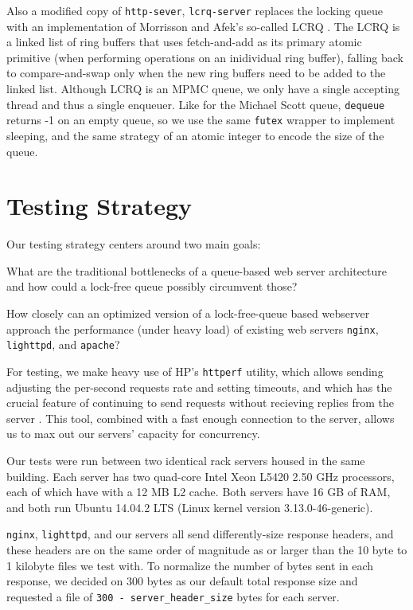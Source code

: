 \documentclass[twoside,10pt]{article}
\begin{document}
\begin{multicols}{2}
Also a modified copy of \verb+http-sever+, \verb+lcrq-server+ replaces
the locking queue with an implementation of Morrisson and Afek's
so-called LCRQ \cite{lcrq-source}. The LCRQ is a linked list of ring buffers that uses
fetch-and-add as its primary atomic primitive (when performing
operations on an inidividual ring buffer), falling back to
compare-and-swap only when the new ring buffers need to be added to
the linked list. Although LCRQ is an MPMC queue, we only have a single
accepting thread and thus a single enqueuer. Like for the Michael
Scott queue, \verb+dequeue+ returns -1 on an empty queue, so we use
the same \verb+futex+ wrapper to implement sleeping, and the same strategy of 
an atomic integer to encode the size of the queue.

\section{Testing Strategy}

Our testing strategy centers around two main goals:

\begin{compactitem}
\item What are the traditional bottlenecks of a queue-based web server
  architecture and how could a lock-free queue possibly circumvent
  those?
\item How closely can an optimized version of a lock-free-queue based
  webserver approach the performance (under heavy load) of existing
  web servers \verb+nginx+, \verb+lighttpd+, and \verb+apache+?
\end{compactitem}

For testing, we make heavy use of HP's \verb+httperf+ utility, which
allows sending adjusting the per-second requests rate and setting
timeouts, and which has the crucial feature of continuing to send
requests without recieving replies from the server
\cite{mosberger1998httperf}. This tool, combined with a fast enough
connection to the server, allows us to max out our servers' capacity
for concurrency.

Our tests were run between two identical rack servers housed in the
same building. Each server has two quad-core Intel Xeon L5420 2.50 GHz
processors, each of which have with a 12 MB L2 cache. Both servers
have 16 GB of RAM, and both run Ubuntu 14.04.2 LTS (Linux kernel version
3.13.0-46-generic).

\verb+nginx+, \verb+lighttpd+, and our servers all send
differently-size response headers, and these headers are on the same
order of magnitude as or larger than the 10 byte to 1 kilobyte files
we test with. To normalize the number of bytes sent in each response,
we decided on 300 bytes as our default total response size and
requested a file of \verb+300 - server_header_size+ bytes for each
server.


\end{multicols}
\end{document}
